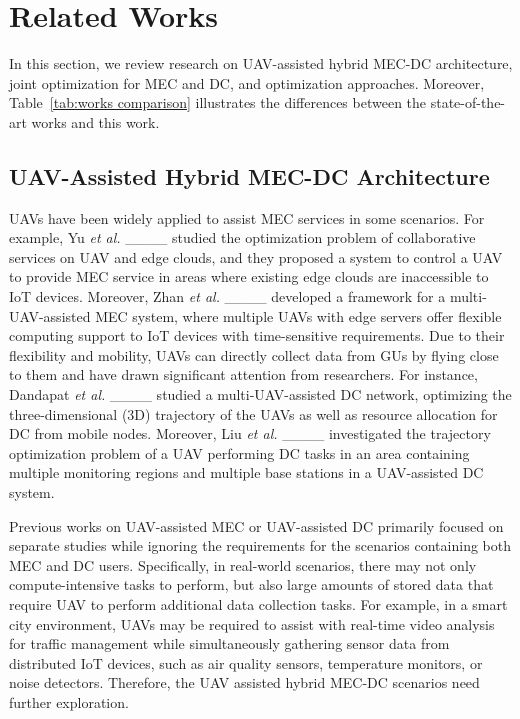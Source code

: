 \section{Related Works}
\label{sec:related works}

\par In this section, we review research on UAV-assisted hybrid MEC-DC architecture, joint optimization for MEC and DC, and optimization approaches. Moreover, Table~\ref{tab:works comparison} illustrates the differences between the state-of-the-art works and this work.

\subsection{UAV-Assisted Hybrid MEC-DC Architecture}

\par UAVs have been widely applied to assist MEC services in some scenarios. For example, Yu \textit{et al.} ____ studied the optimization problem of collaborative services on UAV and edge clouds, and they proposed a system to control a UAV to provide MEC service in areas where existing edge clouds are inaccessible to IoT devices. Moreover, Zhan \textit{et al.} ____ developed a framework for a multi-UAV-assisted MEC system, where multiple UAVs with edge servers offer flexible computing support to IoT devices with time-sensitive requirements. Due to their flexibility and mobility, UAVs can directly collect data from GUs by flying close to them and have drawn significant attention from researchers. For instance, Dandapat \textit{et al.} ____ studied a multi-UAV-assisted DC network, optimizing the three-dimensional (3D) trajectory of the UAVs as well as resource allocation for DC from mobile nodes. Moreover, Liu \textit{et al.} ____ investigated the trajectory optimization problem of a UAV performing DC tasks in an area containing multiple monitoring regions and multiple base stations in a UAV-assisted DC system. 

\par Previous works on UAV-assisted MEC or UAV-assisted DC primarily focused on separate studies while ignoring the requirements for the scenarios containing both MEC and DC users. Specifically, in real-world scenarios, there may not only compute-intensive tasks to perform, but also large amounts of stored data that require UAV to perform additional data collection tasks. For example, in a smart city environment, UAVs may be required to assist with real-time video analysis for traffic management while simultaneously gathering sensor data from distributed IoT devices, such as air quality sensors, temperature monitors, or noise detectors. Therefore, the UAV assisted hybrid MEC-DC scenarios need further exploration.

